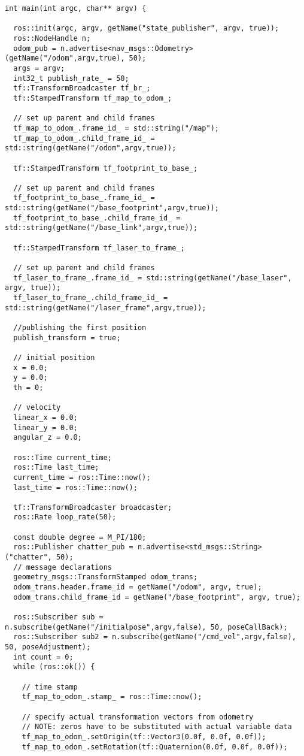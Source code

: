 \begin{lstlisting}
int main(int argc, char** argv) {

  ros::init(argc, argv, getName("state_publisher", argv, true));
  ros::NodeHandle n;
  odom_pub = n.advertise<nav_msgs::Odometry>(getName("/odom",argv,true), 50);
  args = argv;
  int32_t publish_rate_ = 50;
  tf::TransformBroadcaster tf_br_;
  tf::StampedTransform tf_map_to_odom_;

  // set up parent and child frames
  tf_map_to_odom_.frame_id_ = std::string("/map");
  tf_map_to_odom_.child_frame_id_ = std::string(getName("/odom",argv,true));

  tf::StampedTransform tf_footprint_to_base_;

  // set up parent and child frames
  tf_footprint_to_base_.frame_id_ = std::string(getName("/base_footprint",argv,true));
  tf_footprint_to_base_.child_frame_id_ = std::string(getName("/base_link",argv,true));

  tf::StampedTransform tf_laser_to_frame_;

  // set up parent and child frames
  tf_laser_to_frame_.frame_id_ = std::string(getName("/base_laser", argv, true));
  tf_laser_to_frame_.child_frame_id_ = std::string(getName("/laser_frame",argv,true));

  //publishing the first position
  publish_transform = true;

  // initial position
  x = 0.0; 
  y = 0.0;
  th = 0;

  // velocity
  linear_x = 0.0;
  linear_y = 0.0;
  angular_z = 0.0;

  ros::Time current_time;
  ros::Time last_time;
  current_time = ros::Time::now();
  last_time = ros::Time::now();

  tf::TransformBroadcaster broadcaster;
  ros::Rate loop_rate(50);

  const double degree = M_PI/180;
  ros::Publisher chatter_pub = n.advertise<std_msgs::String>("chatter", 50);
  // message declarations
  geometry_msgs::TransformStamped odom_trans;
  odom_trans.header.frame_id = getName("/odom", argv, true);
  odom_trans.child_frame_id = getName("/base_footprint", argv, true);

  ros::Subscriber sub = n.subscribe(getName("/initialpose",argv,false), 50, poseCallBack);
  ros::Subscriber sub2 = n.subscribe(getName("/cmd_vel",argv,false), 50, poseAdjustment);
  int count = 0;
  while (ros::ok()) {

    // time stamp
    tf_map_to_odom_.stamp_ = ros::Time::now();

    // specify actual transformation vectors from odometry
    // NOTE: zeros have to be substituted with actual variable data
    tf_map_to_odom_.setOrigin(tf::Vector3(0.0f, 0.0f, 0.0f));
    tf_map_to_odom_.setRotation(tf::Quaternion(0.0f, 0.0f, 0.0f));


\end{lstlisting}
